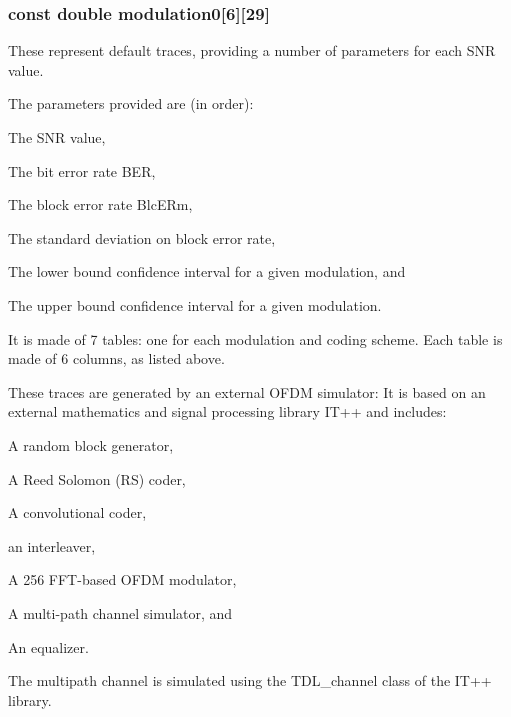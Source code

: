 \subsubsection[{\texorpdfstring{modulation0}{modulation0}}]{\setlength{\rightskip}{0pt plus 5cm}const double modulation0\mbox{[}6\mbox{]}\mbox{[}29\mbox{]}\hspace{0.3cm}{\ttfamily [related]}}\hypertarget{classns3_1_1SNRToBlockErrorRateManager_ab85f6c8f2604855998ed15c069e62513}{}\label{classns3_1_1SNRToBlockErrorRateManager_ab85f6c8f2604855998ed15c069e62513}


These represent default traces, providing a number of parameters for each S\+NR value. 

The parameters provided are (in order)\+:


\begin{DoxyEnumerate}
\item The S\+NR value,
\item The bit error rate B\+ER,
\item The block error rate Blc\+E\+Rm,
\item The standard deviation on block error rate,
\item The lower bound confidence interval for a given modulation, and
\item The upper bound confidence interval for a given modulation.
\end{DoxyEnumerate}

It is made of 7 tables\+: one for each modulation and coding scheme. Each table is made of 6 columns, as listed above.

These traces are generated by an external O\+F\+DM simulator\+: It is based on an external mathematics and signal processing library I\+T++ and includes\+:


\begin{DoxyItemize}
\item A random block generator,
\item A Reed Solomon (RS) coder,
\item A convolutional coder,
\item an interleaver,
\item A 256 F\+F\+T-\/based O\+F\+DM modulator,
\item A multi-\/path channel simulator, and
\item An equalizer.
\end{DoxyItemize}

The multipath channel is simulated using the T\+D\+L\+\_\+channel class of the I\+T++ library.

